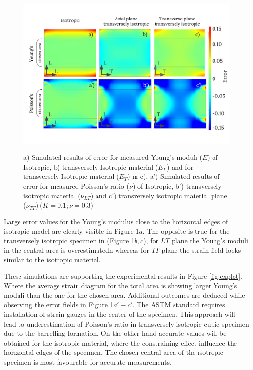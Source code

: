 \documentclass[review]{elsarticle}
\begin{document}
\begin{figure}[h]
\centering
\includegraphics[width=\textwidth]{BarellingError.pdf}
\label{fig:Error}
\caption{\label{fig:Error} a) Simulated results of error for measured Young's
moduli ($E$) of Isotropic, b) transversely Isotropic material ($E_L$) and for
transversely Isotropic material ($E_T$) in c). 
a') Simulated results of error for measured
Poisson's ratio ($\nu$) of Isotropic, b')
transversely isotropic material ($\nu_{LT}$) and c') transversely isotropic
material plane ($\nu_{TT}$).($K=0.1;\nu=0.3$)}

\end{figure}

Large error values for the Young's
modulus close to the horizontal edges of isotropic model are clearly visible in
Figure \ref{fig:Error}$a$. The opposite is true for the transversely isotropic
specimen in (Figure \ref{fig:Error}$b,c$), for $LT$ plane 
the Young's moduli in the central area is overestimatedn whereas for $TT$ plane
the strain field looks similar to the isotropic material.\par
These simulations are supporting the experimental results in Figure
\ref{fig:explot}. Where the average strain diagram for the total area is showing larger Young's moduli than
the one for the chosen area.
Additional outcomes are deduced  while observing the error fields in Figure
\ref{fig:Error}$a'-c'$. The ASTM standard \cite{american2009standard} requires
installation of strain gauges in the center of the specimen. This approach will
lead to underestimation of Poisson's ratio in transversely isotropic cubic
specimen due to the barrelling formation. On the other hand accurate values will
be obtained for the isotropic material, where the constraining effect influence
the horizontal edges of the specimen. The chosen central area of the isotropic
specimen is most favourable for accurate measurements.
\end{document}
